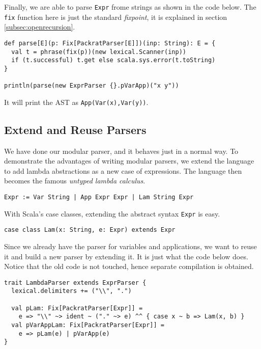 Finally, we are able to parse \lstinline{Expr} frome strings as shown in the code below. The \lstinline{fix} function here is just the standard \textit{fixpoint}, it is explained in section \ref{subsec:openrecursion}.

\begin{lstlisting}
def parse[E](p: Fix[PackratParser[E]])(inp: String): E = {
  val t = phrase(fix(p))(new lexical.Scanner(inp))
  if (t.successful) t.get else scala.sys.error(t.toString)
}

println(parse(new ExprParser {}.pVarApp)("x y"))
\end{lstlisting}

It will print the AST as \lstinline{App(Var(x),Var(y))}.

\subsection{Extend and Reuse Parsers}\label{subsec:overview-extend}

We have done our modular parser, and it behaves just in a normal way. To demonstrate the advantages of writing modular parsers, we extend the language to add lambda abstractions as a new case of expressions. The language then becomes the famous \textit{untyped lambda calculus}.

\begin{lstlisting}[language=PlainCode]
Expr := Var String | App Expr Expr | Lam String Expr
\end{lstlisting}

With Scala's case classes, extending the abstract syntax \lstinline{Expr} is easy.

\begin{lstlisting}
case class Lam(x: String, e: Expr) extends Expr
\end{lstlisting}

Since we already have the parser for variables and applications, we want to reuse it and build a new parser by extending it. It is just what the code below does. Notice that the old code is not touched, hence separate compilation is obtained.

\begin{lstlisting}
trait LambdaParser extends ExprParser {
  lexical.delimiters += ("\\", ".")

  val pLam: Fix[PackratParser[Expr]] =
    e => "\\" ~> ident ~ ("." ~> e) ^^ { case x ~ b => Lam(x, b) }
  val pVarAppLam: Fix[PackratParser[Expr]] =
    e => pLam(e) | pVarApp(e)
}
\end{lstlisting}

